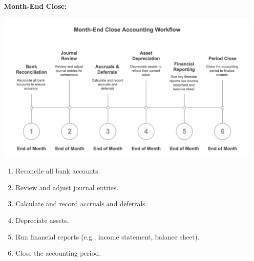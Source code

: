 \documentclass[11pt,a4paper]{article}
\begin{document}
\newpage
\noindent\textbf{Month-End Close:}

\begin{center}
    \includegraphics[width=0.8\linewidth]{diagram/month_end_close.png}
\end{center}

\begin{enumerate}
    \item Reconcile all bank accounts.
    \item Review and adjust journal entries.
    \item Calculate and record accruals and deferrals.
    \item Depreciate assets.
    \item Run financial reports (e.g., income statement, balance sheet).
    \item Close the accounting period.
\end{enumerate}
\end{document}
